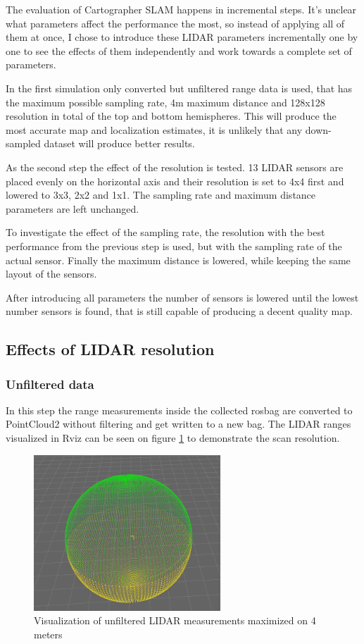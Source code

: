 The evaluation of Cartographer SLAM happens in incremental steps. It's unclear what parameters
affect the performance the most, so instead of applying all of them at once, I chose to introduce
these LIDAR parameters incrementally one by one to see the effects of them independently 
and work towards a complete set of parameters. 

In the first simulation only converted but unfiltered range data is used, that has the 
maximum possible sampling rate, 4m maximum distance and 128x128 resolution in total of 
the top and bottom hemispheres. This will produce the most accurate map and localization 
estimates, it is unlikely that any down-sampled dataset will produce better results.

As the second step the effect of the resolution is tested. 13 LIDAR sensors are placed
evenly on the horizontal axis and their resolution is set to 4x4 first and lowered to 3x3,
2x2 and 1x1. The sampling rate and maximum distance parameters are left unchanged.

To investigate the effect of the sampling rate, the resolution with the best performance 
from the previous step is used, but with the sampling rate of the actual sensor. Finally
the maximum distance is lowered, while keeping the same layout of the sensors.

After introducing all parameters the number of sensors is lowered until the lowest number 
sensors is found, that is still capable of producing a decent quality map.

\subsection{Effects of LIDAR resolution}
\subsubsection{Unfiltered data}
In this step the range measurements inside the collected rosbag are converted to PointCloud2 
without filtering and get written to a new bag. The LIDAR ranges visualized in 
Rviz can be seen on figure \ref{fig:01_maxed_lidar} to demonstrate the scan resolution. 

\begin{figure}[!h]
    \centering
	\includegraphics[width=70mm, keepaspectratio]{figures/01_maxed_lidar.png}
    \caption{Visualization of unfiltered LIDAR measurements maximized on 4 meters}
    \label{fig:01_maxed_lidar}
\end{figure}

